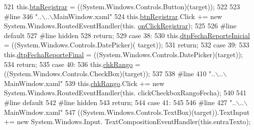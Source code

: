 \begin{DoxyCode}
521             this.\hyperlink{class_proyecto___integrador__3_1_1_main_window_ac1b64fa55a6742a8f529987bfd452c80}{btnRegistrar} = ((System.Windows.Controls.Button)(target));
522             
523 \textcolor{preprocessor}{            #line 346 "..\(\backslash\)..\(\backslash\)MainWindow.xaml"}
524 \textcolor{preprocessor}{}            this.\hyperlink{class_proyecto___integrador__3_1_1_main_window_ac1b64fa55a6742a8f529987bfd452c80}{btnRegistrar}.Click += \textcolor{keyword}{new} System.Windows.RoutedEventHandler(this.
      \hyperlink{class_proyecto___integrador__3_1_1_main_window_a39bbc99ea9b8992b13d0fca168a7c114}{onClickRegistrar});
525             
526 \textcolor{preprocessor}{            #line default}
527 \textcolor{preprocessor}{}\textcolor{preprocessor}{            #line hidden}
528 \textcolor{preprocessor}{}            \textcolor{keywordflow}{return};
529             \textcolor{keywordflow}{case} 38:
530             this.\hyperlink{class_proyecto___integrador__3_1_1_main_window_a44bbca638bf885c2bcc23fcfd2d605ac}{dtpFechaReporteInicial} = ((System.Windows.Controls.DatePicker)(
      target));
531             \textcolor{keywordflow}{return};
532             \textcolor{keywordflow}{case} 39:
533             this.\hyperlink{class_proyecto___integrador__3_1_1_main_window_a19406fef8f65f2f4b8465a1581b6fa2d}{dtpFechaReporteFinal} = ((System.Windows.Controls.DatePicker)(target));
534             \textcolor{keywordflow}{return};
535             \textcolor{keywordflow}{case} 40:
536             this.\hyperlink{class_proyecto___integrador__3_1_1_main_window_a2ff6c258d8e7c249c15fbb0fc627f0d8}{chkRango} = ((System.Windows.Controls.CheckBox)(target));
537             
538 \textcolor{preprocessor}{            #line 410 "..\(\backslash\)..\(\backslash\)MainWindow.xaml"}
539 \textcolor{preprocessor}{}            this.\hyperlink{class_proyecto___integrador__3_1_1_main_window_a2ff6c258d8e7c249c15fbb0fc627f0d8}{chkRango}.Click += \textcolor{keyword}{new} System.Windows.RoutedEventHandler(this.
      clickCheckboxRangoFecha);
540             
541 \textcolor{preprocessor}{            #line default}
542 \textcolor{preprocessor}{}\textcolor{preprocessor}{            #line hidden}
543 \textcolor{preprocessor}{}            \textcolor{keywordflow}{return};
544             \textcolor{keywordflow}{case} 41:
545             
546 \textcolor{preprocessor}{            #line 427 "..\(\backslash\)..\(\backslash\)MainWindow.xaml"}
547 \textcolor{preprocessor}{}            ((System.Windows.Controls.TextBox)(target)).TextInput += \textcolor{keyword}{new} System.Windows.Input.
      TextCompositionEventHandler(\textcolor{keyword}{this}.entraTexto);

\end{DoxyCode}
